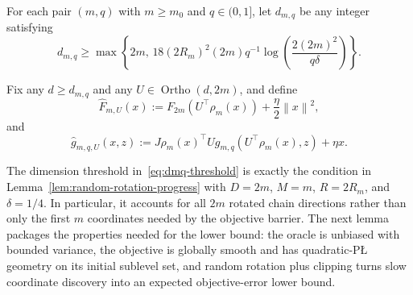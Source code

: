 \documentclass[11pt]{article}
\newcommand{\norm}[1]{\left\lVert #1\right\rVert}
\newcommand{\Ortho}{\operatorname{Ortho}}
\begin{document}
For each pair $(m,q)$ with $m\ge m_0$ and $q\in(0,1]$, let $d_{m,q}$ be any integer satisfying
\begin{equation}
\label{eq:dmq-threshold}
d_{m,q}\ge
\max\left\{
2m,\,
18(2R_m)^2(2m)q^{-1}\log\left(\frac{2(2m)^2}{q\delta}\right)
\right\}.
\end{equation}

Fix any $d\ge d_{m,q}$ and any $U\in \Ortho(d,2m)$, and define
\begin{equation}
\label{eq:hatF-def}
\widehat F_{m,U}(x):=F_{2m}(U^\top \rho_m(x))+\frac{\eta}{2}\norm{x}^2,
\end{equation}
and
\begin{equation}
\label{eq:hatg-def}
\widehat g_{m,q,U}(x,z):=J\rho_m(x)^\top U g_{m,q}(U^\top \rho_m(x),z)+\eta x.
\end{equation}

The dimension threshold in~\eqref{eq:dmq-threshold} is exactly the condition in
Lemma~\ref{lem:random-rotation-progress} with
$D=2m$, $M=m$, $R=2R_m$, and $\delta=1/4$. In particular, it accounts for all $2m$ rotated chain directions rather
than only the first $m$ coordinates needed by the objective barrier. The next lemma packages the properties needed for
the lower bound: the oracle is unbiased with bounded variance, the objective is globally smooth and has
quadratic-P\L{} geometry on its initial sublevel set, and random rotation plus clipping turns slow coordinate discovery
into an expected objective-error lower bound.
\end{document}
